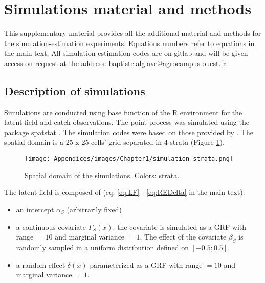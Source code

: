 \newpage

\section{Simulations material and methods}\label{appendix:SimuMandM}

This supplementary material provides all the additional material and methods for the simulation-estimation experiments. Equations numbers refer to equations in the main text. All simulation-estimation codes are on gitlab and will be given access on request at the address: \url{baptiste.alglave@agrocampus-ouest.fr}.

\subsection{Description of simulations}\label{appendix:DescrSimu}

Simulations are conducted using base function of the R environment for the latent field and catch observations. The point process was simulated using the package spatstat \parencite{baddeley-spatial-2015}. The simulation codes were based on those provided by \textcite{conn-confronting-2017}. The spatial domain is a 25 x 25 cells’ grid separated in 4 strata (Figure \ref{fig:DescrSimu}).

\newpage

\begin{figure}[H]
   \begin{center}
      \texttt{[image: Appendices/images/Chapter1/simulation\_strata.png]}
   \end{center}
   \caption[Spatial domain of the simulations.]
   {Spatial domain of the simulations. Colors: strata.}
   \label{fig:DescrSimu}
\end{figure}

The latent field is composed of (eq. \ref{eq:LF} - \ref{eq:REDelta} in the main text):
\begin{itemize}
\item an intercept \(\alpha_S\) (arbitrarily fixed) 
\item a continuous covariate \(\Gamma_S (x)\): the covariate is simulated as a GRF with range \(= 10\) and marginal variance \(= 1\). The effect of the covariate \(\beta_S\) is randomly sampled in a uniform distribution defined on \([-0.5;0.5]\).
\item a random effect \(\delta(x)\) parameterized as a GRF with range \(= 10\) and marginal variance \(= 1\).
\end{itemize}


